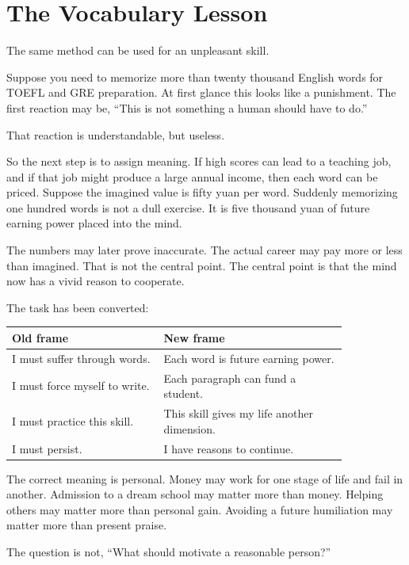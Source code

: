 \section*{The Vocabulary Lesson}

The same method can be used for an unpleasant skill.

Suppose you need to memorize more than twenty thousand English words for TOEFL and GRE preparation. At first glance this looks like a punishment. The first reaction may be, ``This is not something a human should have to do.''

That reaction is understandable, but useless.

So the next step is to assign meaning. If high scores can lead to a teaching job, and if that job might produce a large annual income, then each word can be priced. Suppose the imagined value is fifty yuan per word. Suddenly memorizing one hundred words is not a dull exercise. It is five thousand yuan of future earning power placed into the mind.

The numbers may later prove inaccurate. The actual career may pay more or less than imagined. That is not the central point. The central point is that the mind now has a vivid reason to cooperate.

The task has been converted:

\begin{center}
\begin{tabular}{p{0.38\linewidth}p{0.46\linewidth}}
\hline
Old frame & New frame \\
\hline
I must suffer through words. & Each word is future earning power. \\
I must force myself to write. & Each paragraph can fund a student. \\
I must practice this skill. & This skill gives my life another dimension. \\
I must persist. & I have reasons to continue. \\
\hline
\end{tabular}
\end{center}

The correct meaning is personal. Money may work for one stage of life and fail in another. Admission to a dream school may matter more than money. Helping others may matter more than personal gain. Avoiding a future humiliation may matter more than present praise.

The question is not, ``What should motivate a reasonable person?''

